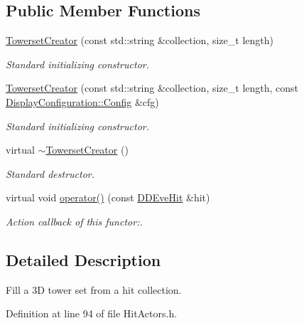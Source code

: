 \subsection*{Public Member Functions}
\begin{DoxyCompactItemize}
\item 
\hyperlink{struct_d_d4hep_1_1_towerset_creator_ad29dbe8a2d87c04776af0852f614ee13}{TowersetCreator} (const std::string \&collection, size\_\-t length)
\begin{DoxyCompactList}\small\item\em Standard initializing constructor. \item\end{DoxyCompactList}\item 
\hyperlink{struct_d_d4hep_1_1_towerset_creator_a7e565ec3d9642bf0a3f778e730d1b9aa}{TowersetCreator} (const std::string \&collection, size\_\-t length, const \hyperlink{class_d_d4hep_1_1_display_configuration_1_1_config}{DisplayConfiguration::Config} \&cfg)
\begin{DoxyCompactList}\small\item\em Standard initializing constructor. \item\end{DoxyCompactList}\item 
virtual \hyperlink{struct_d_d4hep_1_1_towerset_creator_ae74914cad72d7fdd2b78f97cd74b7b90}{$\sim$TowersetCreator} ()
\begin{DoxyCompactList}\small\item\em Standard destructor. \item\end{DoxyCompactList}\item 
virtual void \hyperlink{struct_d_d4hep_1_1_towerset_creator_a5afb1ff94fd502e36e56df19effe7221}{operator()} (const \hyperlink{class_d_d4hep_1_1_d_d_eve_hit}{DDEveHit} \&hit)
\begin{DoxyCompactList}\small\item\em Action callback of this functor:. \item\end{DoxyCompactList}\end{DoxyCompactItemize}


\subsection{Detailed Description}
Fill a 3D tower set from a hit collection. 

Definition at line 94 of file HitActors.h.

